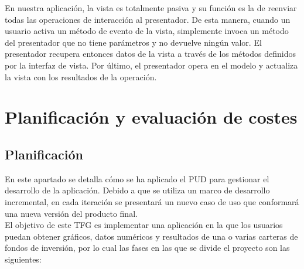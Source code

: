 \documentclass[12pt, a4paper]{book}
\begin{document}
En nuestra aplicación, la vista es totalmente pasiva y su función es la de reenviar todas las operaciones de interacción al presentador. De esta manera, cuando un usuario activa un método de evento de la vista, simplemente invoca un método del presentador que no tiene parámetros y no devuelve ningún valor. El presentador recupera entonces datos de la vista a través de los métodos definidos por la interfaz de vista. Por último, el presentador opera en el modelo y actualiza la vista con los resultados de la operación. 

\newpage

\chapter{Planificación y evaluación de costes}

\section{Planificación}
En este apartado se detalla cómo se ha aplicado el \gls{PUD} para gestionar el desarrollo de la aplicación. Debido a que se utiliza un marco de desarrollo incremental, en cada iteración se presentará un nuevo caso de uso que conformará una nueva versión del producto final.\\

El objetivo de este \gls{TFG} es implementar una aplicación en la que los usuarios puedan obtener gráficos, datos numéricos y resultados de una o varias carteras de fondos de inversión, por lo cual las fases en las que se divide el proyecto son las siguientes:


\end{document}
